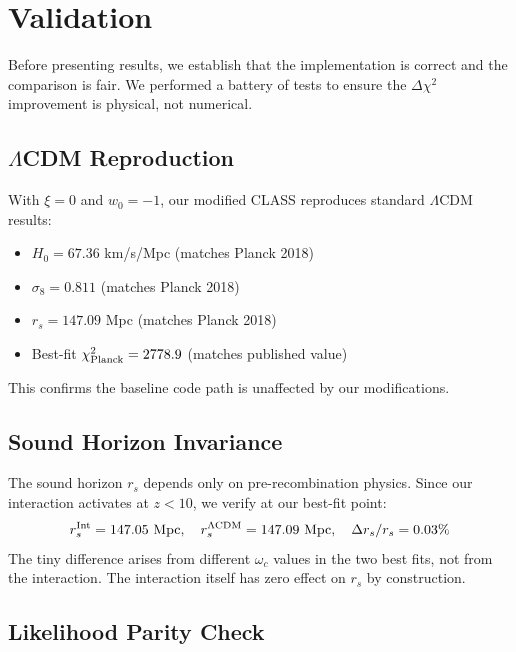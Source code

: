 \documentclass[twocolumn,showpacs,preprintnumbers,amsmath,amssymb,prd]{revtex4-2}
\begin{document}
\section{Validation}
\label{sec:validation}

Before presenting results, we establish that the implementation is correct and the comparison is fair. We performed a battery of tests to ensure the $\Delta\chi^2$ improvement is physical, not numerical.

\subsection{$\Lambda$CDM Reproduction}

With $\xi = 0$ and $w_0 = -1$, our modified CLASS reproduces standard $\Lambda$CDM results:
\begin{itemize}
    \item $H_0 = 67.36$ km/s/Mpc (matches Planck 2018)
    \item $\sigma_8 = 0.811$ (matches Planck 2018)
    \item $r_s = 147.09$ Mpc (matches Planck 2018)
    \item Best-fit $\chi^2_{\rm Planck} = 2778.9$ (matches published value)
\end{itemize}
This confirms the baseline code path is unaffected by our modifications.

\subsection{Sound Horizon Invariance}

The sound horizon $r_s$ depends only on pre-recombination physics. Since our interaction activates at $z < 10$, we verify at our best-fit point:
\begin{equation}
r_s^{\rm Int} = 147.05 \text{ Mpc}, \quad r_s^{\Lambda\rm CDM} = 147.09 \text{ Mpc}, \quad \Delta r_s / r_s = 0.03\%
\end{equation}
The tiny difference arises from different $\omega_c$ values in the two best fits, not from the interaction. The interaction itself has zero effect on $r_s$ by construction.

\subsection{Likelihood Parity Check}
\end{document}
